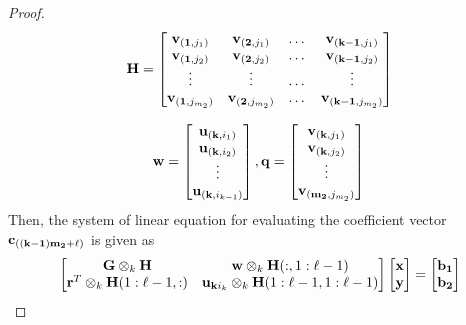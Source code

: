\documentclass{article}
\begin{document}
\begin{proof}
\begin{equation*}
\end{equation*}
\begin{equation*}
\bold{H}=\begin{bmatrix}
\bold{v}_{(\bold{1},j_1)} & \bold{v}_{(\bold{2},j_1)} & \dots & \bold{v}_{(\bold{k-1},j_1)}  \\
\bold{v}_{(\bold{1},j_2)} & \bold{v}_{(\bold{2},j_2)} & \dots & \bold{v}_{(\bold{k-1},j_2)}\\
\vdots & \vdots & \dots & \vdots \\
\bold{v}_{(\bold{1},j_{m_2})} & \bold{v}_{(\bold{2},j_{m_2})} & \dots & \bold{v}_{(\bold{k-1},j_{m_2})}\\
\end{bmatrix}
\end{equation*}

\begin{equation*}
\bold{w}=\begin{bmatrix}
\bold{u}_{(\bold{k},i_1)}\\ \bold{u}_{(\bold{k},i_2)}\\ \vdots \\ \bold{u}_{(\bold{k},i_{k-1})}
\end{bmatrix}\\,
 \bold{q}=\begin{bmatrix}
\bold{v}_{(\bold{k},j_1)} \\ \bold{v}_{(\bold{k},j_2)}\\ \vdots \\ \bold{v}_{(\bold{m_2},j_{m_2})}
\end{bmatrix}\\
\end{equation*}
 Then, the system of linear equation for evaluating the coefficient vector $\bold{c}_{(\bold{(k-1)m_2+\ell)}}$ is given as
\begin{equation}\label{eq:eq339}
\scriptsize{\begin{bmatrix}
\bold{G} \otimes_k \bold{H} & \bold{w} \otimes_k \bold{H}(:, 1:\ell-1)\\
\bold{r}^T \otimes_k \bold{H}(1:\ell-1,:) & \bold{u}_{\bold{k}i_k}\otimes_k \bold{H}(1:\ell-1, 1:\ell-1) \\
\end{bmatrix}
\begin{bmatrix}
\bold{x} \\ \bold{y} 
\end{bmatrix}
=
\begin{bmatrix}
\bold{b_1} \\
\bold{b_2} \\

\end{bmatrix}}
\end{equation}
\end{proof}
\end{document}
